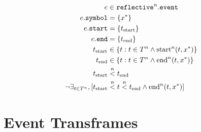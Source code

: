 \begin{align}
\label{equation:define_perceptual_event_first}
                                         e &\in \text{\tt{reflective}}^n.\text{\tt{event}} \\
                      e.\text{\tt{symbol}} &= \{x^*\} \\
                       e.\text{\tt{start}} &= \{t_\text{start}\} \\
                         e.\text{\tt{end}} &= \{t_\text{end}\} \\
                             t_\text{start} &\in \{t : t \in T^n \wedge \text{start}^n(t, x^*)\} \\
                               t_\text{end} &\in \{t : t \in T^n \wedge \text{end}^n(t, x^*)\} \\
                             t_\text{start} &\stackrel{n}{<} t_\text{end} \\
\label{equation:define_perceptual_event_last}
 \neg\exists_{t \in T^n}, [t_\text{start} &\stackrel{n}{<} t \stackrel{n}{<} t_\text{end} \wedge \text{end}^n(t, x^*)]
\end{align}

\section{Event Transframes}

